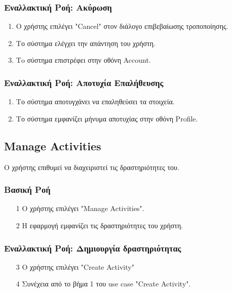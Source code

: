 \subsubsection{Εναλλακτική Ροή: Ακύρωση}

\begin{enumerate}
    \item Ο χρήστης επιλέγει "Cancel" στον διάλογο επιβεβαίωσης τροποποίησης.
    \item Το σύστημα ελέγχει την απάντηση του χρήστη.
    \item Τo σύστημα επιστρέφει στην οθόνη Account.
\end{enumerate}

\subsubsection{Εναλλακτική Ροή: Αποτυχία Επαλήθευσης}

\begin{enumerate}
    \item Το σύστημα αποτυγχάνει να επαληθεύσει τα στοιχεία.
    \item Το σύστημα εμφανίζει μήνυμα αποτυχίας στην οθόνη Profile.
\end{enumerate}


%

\subsection{Manage Activities}

Ο χρήστης επιθυμεί να διαχειριστεί τις δραστηριότητες του.

\subsubsection{Βασική Ροή}

\begin{enumerate}
    \item[1] Ο χρήστης επιλέγει "Manage Activities".
    \item[2] Η εφαρμογή εμφανίζει τις δραστηριότητες του χρήστη.
\end{enumerate}

\subsubsection{Εναλλακτική Ροή: Δημιουργία δραστηριότητας}

\begin{enumerate}
    \item[3] Ο χρήστης επιλέγει "Create Activity"
    \item[4] Συνέχεια από το βήμα 1 του use case "Create Activity".
\end{enumerate}

